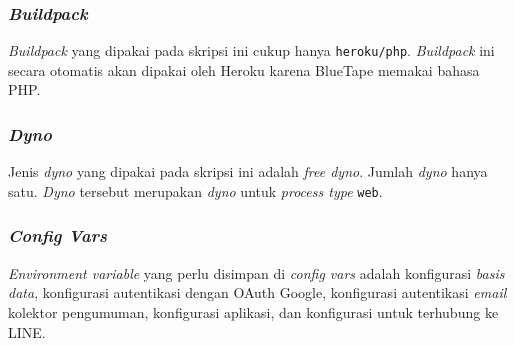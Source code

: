 	\subsubsection{\textit{Buildpack}}
	\textit{Buildpack} yang dipakai pada skripsi ini cukup hanya \texttt{heroku/php}. \textit{Buildpack} ini secara otomatis akan dipakai oleh Heroku karena BlueTape memakai bahasa PHP.
		
	\subsubsection{\textit{Dyno}}
		Jenis \textit{dyno} yang dipakai pada skripsi ini adalah \textit{free dyno}. Jumlah \textit{dyno} hanya satu. \textit{Dyno} tersebut merupakan \textit{dyno} untuk \textit{process type} \texttt{web}.
		
	\subsubsection{\textit{Config Vars}}
		\textit{Environment variable} yang perlu disimpan di \textit{config vars} adalah konfigurasi \textit{basis data}, konfigurasi autentikasi dengan OAuth Google, konfigurasi autentikasi \textit{email} kolektor pengumuman, konfigurasi aplikasi, dan konfigurasi untuk terhubung ke LINE.
		
